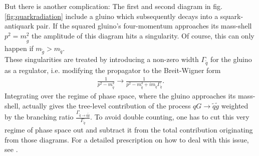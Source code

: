 But there is another complication: The first and second diagram in fig. \ref{fig:quarkradiation} include a gluino which subsequently decays into a squark-antiquark pair. If the squared gluino's four-momentum approaches its mass-shell $p^2 = m^2_{\tilde{g}}$ the amplitude of this diagram hits a singularity. Of course, this can only happen if $m_{\tilde{g}} > m_{\tilde{q}}$.\\
These singularities are treated by introducing a non-zero width $\Gamma_{\tilde{q}}$ for the gluino as a regulator, i.e. modifying the propagator to the Breit-Wigner form
\begin{align}
\frac{1}{p^2 - m_{\tilde{q}}^2} \to \frac{1}{p^2 - m_{\tilde{q}}^2 + i m_{\tilde{q}} \Gamma_{\tilde{q}}}.
\end{align}
Integrating over the regime of phase space, where the gluino approaches its mass-shell, actually gives the tree-level contribution of the process $qG \to \tilde{q}\tilde{g}$ weighted by the branching ratio $\frac{\Gamma_{\tilde{q}\to q \tilde{g}}}{\Gamma_{\tilde{q}}}$. To avoid double counting, one has to cut this very regime of phase space out and subtract it from the total contribution originating from those diagrams. For a detailed prescription on how to deal with this issue, see \cite{Beenakker:1996ch, Gavin:2013kga}.


\newpage